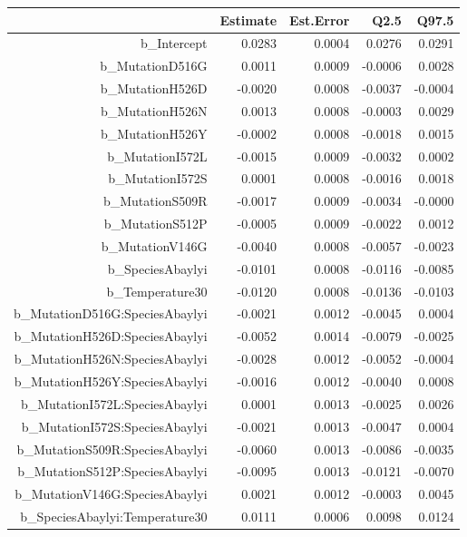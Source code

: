 \begin{table}[ht]
\centering
\begingroup\footnotesize
\begin{tabular}{rrrrr}
  \hline
 & Estimate & Est.Error & Q2.5 & Q97.5 \\ 
  \hline
b\_Intercept & 0.0283 & 0.0004 & 0.0276 & 0.0291 \\ 
  b\_MutationD516G & 0.0011 & 0.0009 & -0.0006 & 0.0028 \\ 
  b\_MutationH526D & -0.0020 & 0.0008 & -0.0037 & -0.0004 \\ 
  b\_MutationH526N & 0.0013 & 0.0008 & -0.0003 & 0.0029 \\ 
  b\_MutationH526Y & -0.0002 & 0.0008 & -0.0018 & 0.0015 \\ 
  b\_MutationI572L & -0.0015 & 0.0009 & -0.0032 & 0.0002 \\ 
  b\_MutationI572S & 0.0001 & 0.0008 & -0.0016 & 0.0018 \\ 
  b\_MutationS509R & -0.0017 & 0.0009 & -0.0034 & -0.0000 \\ 
  b\_MutationS512P & -0.0005 & 0.0009 & -0.0022 & 0.0012 \\ 
  b\_MutationV146G & -0.0040 & 0.0008 & -0.0057 & -0.0023 \\ 
  b\_SpeciesAbaylyi & -0.0101 & 0.0008 & -0.0116 & -0.0085 \\ 
  b\_Temperature30 & -0.0120 & 0.0008 & -0.0136 & -0.0103 \\ 
  b\_MutationD516G:SpeciesAbaylyi & -0.0021 & 0.0012 & -0.0045 & 0.0004 \\ 
  b\_MutationH526D:SpeciesAbaylyi & -0.0052 & 0.0014 & -0.0079 & -0.0025 \\ 
  b\_MutationH526N:SpeciesAbaylyi & -0.0028 & 0.0012 & -0.0052 & -0.0004 \\ 
  b\_MutationH526Y:SpeciesAbaylyi & -0.0016 & 0.0012 & -0.0040 & 0.0008 \\ 
  b\_MutationI572L:SpeciesAbaylyi & 0.0001 & 0.0013 & -0.0025 & 0.0026 \\ 
  b\_MutationI572S:SpeciesAbaylyi & -0.0021 & 0.0013 & -0.0047 & 0.0004 \\ 
  b\_MutationS509R:SpeciesAbaylyi & -0.0060 & 0.0013 & -0.0086 & -0.0035 \\ 
  b\_MutationS512P:SpeciesAbaylyi & -0.0095 & 0.0013 & -0.0121 & -0.0070 \\ 
  b\_MutationV146G:SpeciesAbaylyi & 0.0021 & 0.0012 & -0.0003 & 0.0045 \\ 
  b\_SpeciesAbaylyi:Temperature30 & 0.0111 & 0.0006 & 0.0098 & 0.0124 \\ 

\end{tabular}
\end{table}

